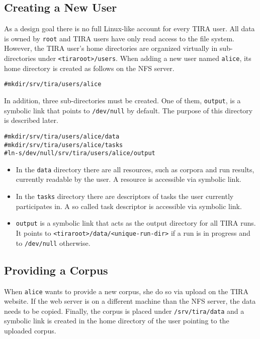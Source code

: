 \documentclass[12pt,a4paper,oneside,titlepage,draft]{report}
\newcommand{\tira}{TIRA\xspace}
\newenvironment{code}
  {\small\color{RubineRed}\begin{alltt}}
  {\end{alltt}}
\begin{document}
\subsection{Creating a New User}
As a design goal there is no full Linux-like account for every \tira user. All data is owned by \texttt{root} and \tira users have only read access to the file system. However, the \tira user's home directories are organized virtually in sub-directories under \texttt{<tiraroot>/users}. When adding a new user named \texttt{alice}, its home directory is created as follows on the NFS server.

\begin{code}
# mkdir /srv/tira/users/alice
\end{code}

In addition, three sub-directories must be created. One of them, \texttt{output}, is a symbolic link that points to \texttt{/dev/null} by default. The purpose of this directory is described later. %

\begin{code}
# mkdir /srv/tira/users/alice/data
# mkdir /srv/tira/users/alice/tasks
# ln -s /dev/null /srv/tira/users/alice/output
\end{code}

\begin{itemize}
\item In the \texttt{data} directory there are all resources, such as corpora and run results, currently readable by the user. A resource is accessible via symbolic link.
\item In the \texttt{tasks} directory there are descriptors of tasks the user currently participates in. A so called task descriptor is accessible via symbolic link.
\item \texttt{output} is a symbolic link that acts as the output directory for all \tira runs. It points to \texttt{<tiraroot>/data/<unique-run-dir>} if a run is in progress and to \texttt{/dev/null} otherwise.
\end{itemize}

\subsection{Providing a Corpus}
When \texttt{alice} wants to provide a new corpus, she do so via upload on the \tira website. If the web server is on a different machine than the NFS server, the data needs to be copied. Finally, the corpus is placed under \texttt{/srv/tira/data} and a symbolic link is created in the home directory of the user pointing to the uploaded corpus.
\end{document}
